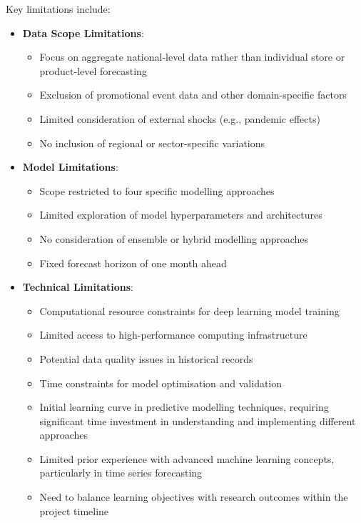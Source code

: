 \documentclass[12pt,a4paper]{report}
\begin{document}
Key limitations include:
\begin{itemize}
    \item \textbf{Data Scope Limitations}:
    \begin{itemize}
        \item Focus on aggregate national-level data rather than individual store or product-level forecasting
        \item Exclusion of promotional event data and other domain-specific factors
        \item Limited consideration of external shocks (e.g., pandemic effects)
        \item No inclusion of regional or sector-specific variations
    \end{itemize}
    
    \item \textbf{Model Limitations}:
    \begin{itemize}
        \item Scope restricted to four specific modelling approaches
        \item Limited exploration of model hyperparameters and architectures
        \item No consideration of ensemble or hybrid modelling approaches
        \item Fixed forecast horizon of one month ahead
    \end{itemize}
    
    \item \textbf{Technical Limitations}:
    \begin{itemize}
        \item Computational resource constraints for deep learning model training
        \item Limited access to high-performance computing infrastructure
        \item Potential data quality issues in historical records
        \item Time constraints for model optimisation and validation
        \item Initial learning curve in predictive modelling techniques, requiring significant time investment in understanding and implementing different approaches
        \item Limited prior experience with advanced machine learning concepts, particularly in time series forecasting
        \item Need to balance learning objectives with research outcomes within the project timeline
    \end{itemize}
\end{itemize}
\end{document}
